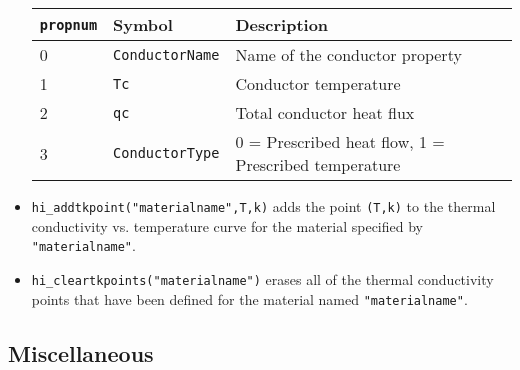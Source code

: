 \begin{itemize}
\begin{tabular}{lll}
\texttt{propnum} & Symbol & Description \\ \hline
  0 & \texttt{ConductorName} & Name of the conductor property \\
  1 & \texttt{Tc} &  Conductor temperature \\
  2 & \texttt{qc} &  Total conductor heat flux \\
  3 & \texttt{ConductorType} & 0 = Prescribed heat flow, 1 = Prescribed temperature
\end{tabular}

\item \texttt{hi\_addtkpoint("materialname",T,k)} adds
the point {\tt (T,k)} to the thermal conductivity vs. temperature curve for the material specified by
{\tt "materialname"}.

\item \texttt{hi\_cleartkpoints("materialname")} erases
all of the thermal conductivity points that have been defined for the material named
{\tt "materialname"}.

\end{itemize}

\subsection{Miscellaneous}

